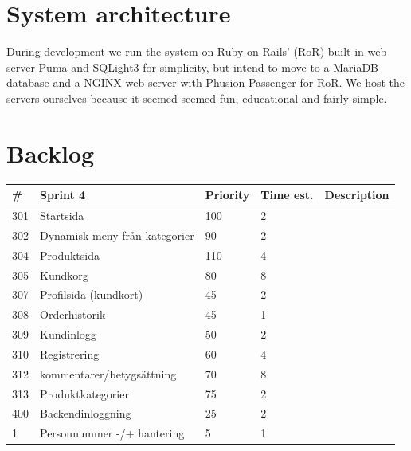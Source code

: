 \documentclass[paper=a4, fontsize=11pt]{report} %
\begin{document}
\begin{itemize}
\section*{System architecture}
	During development we run the system on Ruby on Rails' (RoR) built in web server
	Puma and SQLight3 for simplicity, but intend to move to a MariaDB database
	and a NGINX web server with Phusion Passenger for RoR. We host
	the servers ourselves because it seemed seemed fun, educational and fairly simple.

\section*{Backlog}


	\begin{tabular}{|l|l|l|l|l|}
		\hline
		 \#  & Sprint 4                      & Priority & Time est. & Description \\ \hline
		 301 & Startsida                     & 100      & 2         &             \\ \hline
		 302 & Dynamisk meny från kategorier & 90       & 2         &             \\ \hline
		 304 & Produktsida                   & 110      & 4         &             \\ \hline
		 305 & Kundkorg                      & 80       & 8         &             \\ \hline
		 307 & Profilsida (kundkort)         & 45       & 2         &             \\ \hline
		 308 & Orderhistorik                 & 45       & 1         &             \\ \hline
		 309 & Kundinlogg                    & 50       & 2         &             \\ \hline
		 310 & Registrering                  & 60       & 4         &             \\ \hline
		 312 & kommentarer/betygsättning     & 70       & 8         &             \\ \hline
		 313 & Produktkategorier             & 75       & 2         &             \\ \hline
		 400 & Backendinloggning             & 25       & 2         &             \\ \hline
		 1   & Personnummer -/+ hantering    & 5        & 1         &             \\ \hline
	\end{tabular}


\end{itemize}
\end{document}
